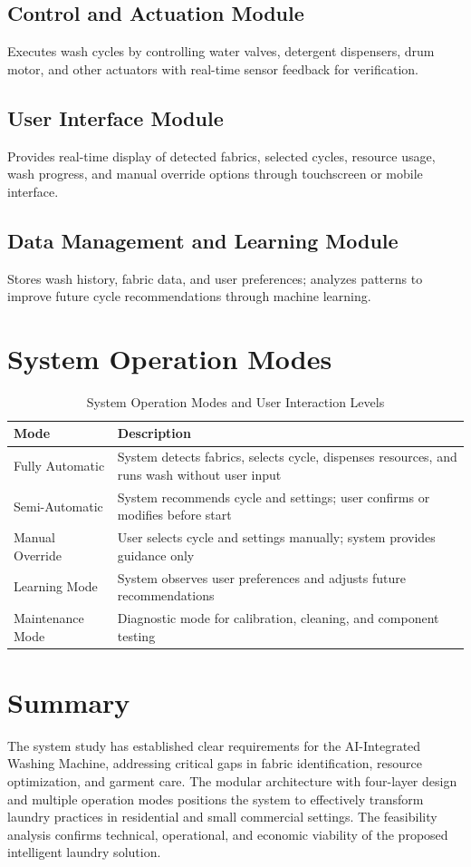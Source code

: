 \subsection{Control and Actuation Module}
Executes wash cycles by controlling water valves, detergent dispensers, drum motor, and other actuators with real-time sensor feedback for verification.

\subsection{User Interface Module}
Provides real-time display of detected fabrics, selected cycles, resource usage, wash progress, and manual override options through touchscreen or mobile interface.

\subsection{Data Management and Learning Module}
Stores wash history, fabric data, and user preferences; analyzes patterns to improve future cycle recommendations through machine learning.

\section{System Operation Modes}

\begin{table}[H]
\centering
\begin{tabular}{|l|p{8cm}|}
\hline
\textbf{Mode} & \textbf{Description} \\
\hline
Fully Automatic & System detects fabrics, selects cycle, dispenses resources, and runs wash without user input \\
\hline
Semi-Automatic & System recommends cycle and settings; user confirms or modifies before start \\
\hline
Manual Override & User selects cycle and settings manually; system provides guidance only \\
\hline
Learning Mode & System observes user preferences and adjusts future recommendations \\
\hline
Maintenance Mode & Diagnostic mode for calibration, cleaning, and component testing \\
\hline
\end{tabular}
\caption{System Operation Modes and User Interaction Levels}
\label{tab:modes}
\end{table}

\section{Summary}
The system study has established clear requirements for the AI-Integrated Washing Machine, addressing critical gaps in fabric identification, resource optimization, and garment care. The modular architecture with four-layer design and multiple operation modes positions the system to effectively transform laundry practices in residential and small commercial settings. The feasibility analysis confirms technical, operational, and economic viability of the proposed intelligent laundry solution.